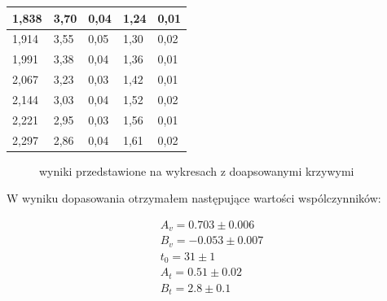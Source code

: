 \documentclass[10pt,a4paper]{article}
\begin{document}
\begin{table}[h]
{\begin{tabular}{|l|l|l|l|l|}
            1,838                                     & 3,70                               & 0,04                       & 1,24                                              & 0,01                                  \\ \hline
            1,914                                     & 3,55                               & 0,05                       & 1,30                                              & 0,02                                  \\ \hline
            1,991                                     & 3,38                               & 0,04                       & 1,36                                              & 0,01                                  \\ \hline
            2,067                                     & 3,23                               & 0,03                       & 1,42                                              & 0,01                                  \\ \hline
            2,144                                     & 3,03                               & 0,04                       & 1,52                                              & 0,02                                  \\ \hline
            2,221                                     & 2,95                               & 0,03                       & 1,56                                              & 0,01                                  \\ \hline
            2,297                                     & 2,86                               & 0,04                       & 1,61                                              & 0,02                                  \\ \hline
        \end{tabular}%
    }
\end{table}

\begin{figure}[h]
    \centering
    \resizebox{0.49\textwidth}{!}{}
    \resizebox{0.49\textwidth}{!}{}
    \caption{wyniki przedstawione na wykresach z doapsowanymi krzywymi}
    \label{kal2}
\end{figure}
\newpage

W wyniku dopasowania otrzymałem następujące wartości wspólczynników:

\begin{gather*}
    A_v =  0.703 \pm 0.006 \\
    B_v = -0.053 \pm 0.007 \\
    t_0 = 31 \pm 1 \\
    A_t = 0.51 \pm 0.02 \\
    B_t = 2.8 \pm 0.1 \\
\end{gather*}
\end{document}
